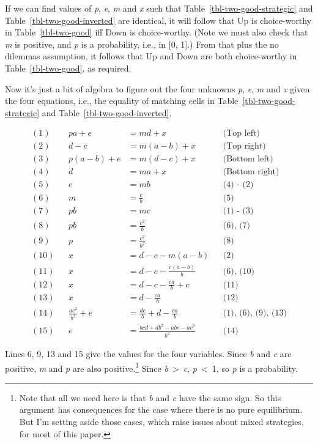\documentclass[
  10pt,
  letterpaper,
  DIV=11,
  numbers=noendperiod,
  twoside]{scrartcl}
\begin{document}
If we can find values of \emph{p}, \emph{e}, \emph{m} and \emph{x} such
that Table~\ref{tbl-two-good-strategic} and
Table~\ref{tbl-two-good-inverted} are identical, it will follow that Up
is choice-worthy in Table~\ref{tbl-two-good} iff Down is choice-worthy.
(Note we must also check that \emph{m} is positive, and \emph{p} is a
probability, i.e., in {[}0, 1{]}.) From that plus the no dilemmas
assumption, it follows that Up and Down are both choice-worthy in
Table~\ref{tbl-two-good}, as required.

Now it's just a bit of algebra to figure out the four unknowns \emph{p},
\emph{e}, \emph{m} and \emph{x} given the four equations, i.e., the
equality of matching cells in Table~\ref{tbl-two-good-strategic} and
Table~\ref{tbl-two-good-inverted}.

\begin{align*}
(1) && pa + e &= md + x && \text{(Top left)} \\
(2) && d - c &= m(a - b) + x && \text{(Top right)} \\
(3) && p(a - b) + e &= m(d - c) + x && \text{(Bottom left)} \\
(4) && d &= ma + x && \text{(Bottom right)} \\
(5) && c &= mb && \text{(4) - (2)} \\
(6) && m &= \frac{c}{b} && \text{(5)} \\
(7) && pb &= mc && \text{(1) - (3)} \\
(8) && pb &= \frac{c^2}{b} && \text{(6), (7)} \\
(9) && p &= \frac{c^2}{b^2} && \text{(8)} \\
(10) && x &= d - c - m(a - b) && \text{(2)} \\
(11) && x &= d - c - \frac{c(a - b)}{b} && \text{(6), (10)} \\
(12) && x &= d - c - \frac{ca}{b} + c && \text{(11)} \\
(13) && x &= d - \frac{ca}{b} && \text{(12)} \\
(14) && \frac{ac^2}{b^2} + e &= \frac{dc}{b} + d - \frac{ca}{b} && \text{(1), (6), (9), (13)} \\
(15) && e &= \frac{bcd + db^2 - abc - ac^2}{b^2} && \text{(14)}
\end{align*}

Lines 6, 9, 13 and 15 give the values for the four variables. Since
\emph{b} and \emph{c} are positive, \emph{m} and \emph{p} are also
positive.\footnote{Note that all we need here is that \emph{b} and
  \emph{c} have the same sign. So this argument has consequences for the
  case where there is no pure equilibrium. But I'm setting aside those
  cases, which raise issues about mixed strategies, for most of this
  paper.} Since \emph{b}~\textgreater~\emph{c}, \emph{p}~\textless~1, so
\emph{p} is a probability.
\end{document}
